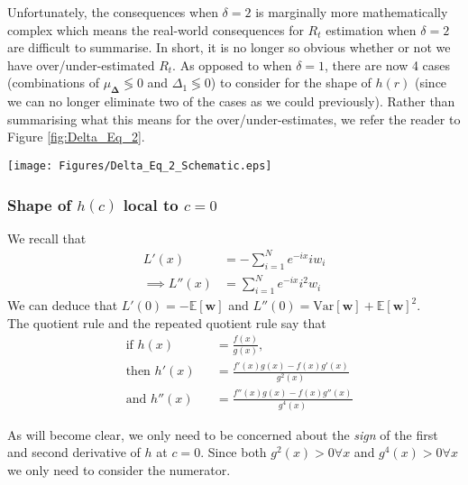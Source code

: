 \documentclass[10pt,journal,compsoc]{IEEEtran}
\begin{document}
Unfortunately, the consequences when $\delta=2$ is marginally more mathematically complex which means the real-world consequences for $R_t$ estimation when $\delta=2$ are difficult to summarise. In short, it is no longer so obvious whether or not we have over/under-estimated $R_t$. As opposed to when $\delta=1$, there are now 4 cases (combinations of $\mu_{\boldsymbol{\Delta}} \lessgtr 0$ and $\Delta_1 \lessgtr 0$) to consider for the shape of $h(r)$ (since we can no longer eliminate two of the cases as we could previously). Rather than summarising what this means for the over/under-estimates, we refer the reader to Figure \ref{fig:Delta_Eq_2}.

\begin{figure*}
\centering
\texttt{[image: Figures/Delta\_Eq\_2\_Schematic.eps]}
\label{fig:Delta_Eq_2}
\end{figure*}



\subsubsection{Shape of $h(c)$ local to $c=0$}
We recall that 
\begin{align*}
L'(x) &= -\sum_{i=1}^{N}e^{-ix}iw_i \\
\implies L''(x) &= \sum_{i=1}^{N}e^{-ix}i^2w_i
\end{align*}
We can deduce that $L'(0) = -\mathbb{E}[\boldsymbol{w}]$ and $L''(0) = \mathrm{Var}[\boldsymbol{w}]+\mathbb{E}[\boldsymbol{w}]^2$.\\
The quotient rule and the repeated quotient rule say that
\begin{align*}
&\text{if }
    h(x)&&= \frac{f(x)}{g(x)} \text{,}\\
    &\text{then }
    h'(x)&&= \frac{f'(x)g(x) - f(x)g'(x)}{g^2(x)}\\
    &\text{and }
    h''(x)&&= \frac{f''(x)g(x)-f(x)g''(x)}{g^4(x)}
\end{align*}

As will become clear, we only need to be concerned about the \textit{sign} of the first and second derivative of $h$ at $c=0$. Since both $g^2(x)>0 \forall x$ and $g^4(x)>0 \forall x$ we only need to consider the numerator.
\end{document}
